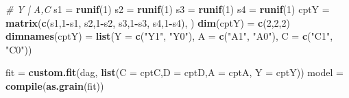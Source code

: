 \documentclass[
]{article}
\newenvironment{Shaded}{\begin{snugshade}}{\end{snugshade}}
\newcommand{\AttributeTok}[1]{\textcolor[rgb]{0.13,0.29,0.53}{#1}}
\newcommand{\CommentTok}[1]{\textcolor[rgb]{0.56,0.35,0.01}{\textit{#1}}}
\newcommand{\DecValTok}[1]{\textcolor[rgb]{0.00,0.00,0.81}{#1}}
\newcommand{\FunctionTok}[1]{\textcolor[rgb]{0.13,0.29,0.53}{\textbf{#1}}}
\newcommand{\NormalTok}[1]{#1}
\newcommand{\OtherTok}[1]{\textcolor[rgb]{0.56,0.35,0.01}{#1}}
\newcommand{\SpecialCharTok}[1]{\textcolor[rgb]{0.81,0.36,0.00}{\textbf{#1}}}
\newcommand{\StringTok}[1]{\textcolor[rgb]{0.31,0.60,0.02}{#1}}
\begin{document}
\begin{Shaded}
\begin{Highlighting}[]
     \CommentTok{\# Y | A,C}
\NormalTok{  s1 }\OtherTok{=} \FunctionTok{runif}\NormalTok{(}\DecValTok{1}\NormalTok{)}
\NormalTok{  s2 }\OtherTok{=} \FunctionTok{runif}\NormalTok{(}\DecValTok{1}\NormalTok{)}
\NormalTok{  s3 }\OtherTok{=} \FunctionTok{runif}\NormalTok{(}\DecValTok{1}\NormalTok{)}
\NormalTok{  s4 }\OtherTok{=} \FunctionTok{runif}\NormalTok{(}\DecValTok{1}\NormalTok{)}
\NormalTok{  cptY }\OtherTok{=} \FunctionTok{matrix}\NormalTok{(}\FunctionTok{c}\NormalTok{(s1,}\DecValTok{1}\SpecialCharTok{{-}}\NormalTok{s1,}
\NormalTok{                  s2,}\DecValTok{1}\SpecialCharTok{{-}}\NormalTok{s2,}
\NormalTok{                  s3,}\DecValTok{1}\SpecialCharTok{{-}}\NormalTok{s3,}
\NormalTok{                  s4,}\DecValTok{1}\SpecialCharTok{{-}}\NormalTok{s4),}
\NormalTok{                )}
  \FunctionTok{dim}\NormalTok{(cptY) }\OtherTok{=} \FunctionTok{c}\NormalTok{(}\DecValTok{2}\NormalTok{,}\DecValTok{2}\NormalTok{,}\DecValTok{2}\NormalTok{)}
  \FunctionTok{dimnames}\NormalTok{(cptY) }\OtherTok{=} \FunctionTok{list}\NormalTok{(}\AttributeTok{Y =} \FunctionTok{c}\NormalTok{(}\StringTok{"Y1"}\NormalTok{, }\StringTok{"Y0"}\NormalTok{), }\AttributeTok{A =} \FunctionTok{c}\NormalTok{(}\StringTok{"A1"}\NormalTok{, }\StringTok{"A0"}\NormalTok{), }\AttributeTok{C =} \FunctionTok{c}\NormalTok{(}\StringTok{"C1"}\NormalTok{, }\StringTok{"C0"}\NormalTok{))}

\NormalTok{  fit }\OtherTok{=} \FunctionTok{custom.fit}\NormalTok{(dag, }\FunctionTok{list}\NormalTok{(}\AttributeTok{C =}\NormalTok{ cptC,}\AttributeTok{D =}\NormalTok{ cptD,}\AttributeTok{A =}\NormalTok{ cptA, }\AttributeTok{Y =}\NormalTok{ cptY))}
\NormalTok{  model }\OtherTok{=} \FunctionTok{compile}\NormalTok{(}\FunctionTok{as.grain}\NormalTok{(fit))}
  

\end{Highlighting}
\end{Shaded}
\end{document}
